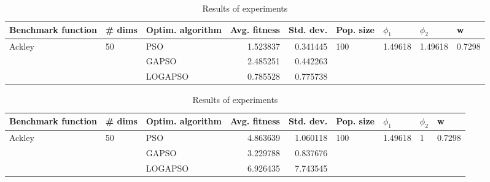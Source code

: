 \documentclass{article}
\begin{document}
\begin{table}
\centering
\caption{Results of experiments}
\begin{tabular}{lllrrllll}
\toprule
     Benchmark function &             \# dims & Optim. algorithm &  Avg. fitness &  Std. dev. &            Pop. size &               $\phi_{1}$ &               $\phi_{2}$ &                       w \\
\midrule
\multirow{3}{*}{Ackley} & \multirow{3}{*}{50} &              PSO &      1.523837 &   0.341445 & \multirow{3}{*}{100} & \multirow{3}{*}{1.49618} & \multirow{3}{*}{1.49618} & \multirow{3}{*}{0.7298} \\
                        &                     &            GAPSO &      2.485251 &   0.442263 &                      &                          &                          &                         \\
                        &                     &          LOGAPSO &      0.785528 &   0.775738 &                      &                          &                          &                         \\
\bottomrule
\end{tabular}
\end{table}
\begin{table}
\centering
\caption{Results of experiments}
\begin{tabular}{lllrrllll}
\toprule
     Benchmark function &             \# dims & Optim. algorithm &  Avg. fitness &  Std. dev. &            Pop. size &               $\phi_{1}$ &         $\phi_{2}$ &                       w \\
\midrule
\multirow{3}{*}{Ackley} & \multirow{3}{*}{50} &              PSO &      4.863639 &   1.060118 & \multirow{3}{*}{100} & \multirow{3}{*}{1.49618} & \multirow{3}{*}{1} & \multirow{3}{*}{0.7298} \\
                        &                     &            GAPSO &      3.229788 &   0.837676 &                      &                          &                    &                         \\
                        &                     &          LOGAPSO &      6.926435 &   7.743545 &                      &                          &                    &                         \\
\bottomrule
\end{tabular}
\end{table}
\end{document}

